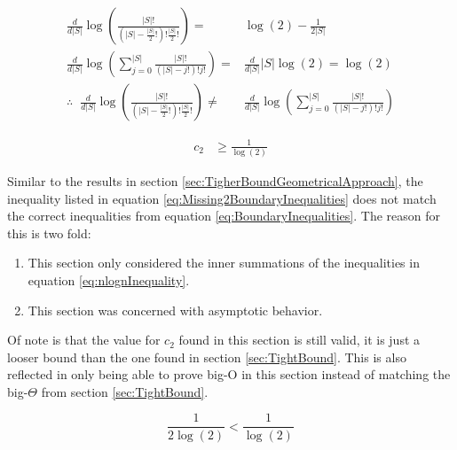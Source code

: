 \documentclass{article}
\begin{document}
\begin{equation*}
	\begin{split}
		\frac{d}{d|S|}				
		\log \left( \frac{
			|S|!
		}{
			\left(|S|-\frac{|S|}{2}!\right)!\frac{|S|}{2}!
		} \right)
		= &
		\log(2)-\frac{1}{2|S|}
		\\
		\frac{d}{d|S|}				
		\log \left( \sum_{j=0}^{|S|} \frac{
			|S|!
		}{
			\left(|S|-j!\right)!j!
		} \right)
		= &
		\frac{d}{d|S|} |S|\log(2)=\log(2)
		\\
		\therefore  \;\;
		\frac{d}{d|S|}				
		\log \left( \frac{
			|S|!
		}{
			\left(|S|-\frac{|S|}{2}!\right)!\frac{|S|}{2}!
		} \right)
		\ne &
		\frac{d}{d|S|}				
		\log \left( \sum_{j=0}^{|S|} \frac{
			|S|!
		}{
			\left(|S|-j!\right)!j!
		} \right)
	\end{split}	
\end{equation*}

\begin{equation}
	\begin{split}
        c_2 &\ge \frac{1}{\log(2)}
	\end{split}
	\label{eq:Missing2BoundaryInequalities}
\end{equation}

Similar to the results in section \ref{sec:TigherBoundGeometricalApproach}, the inequality listed in equation \ref{eq:Missing2BoundaryInequalities} does not match the correct inequalities from equation \ref{eq:BoundaryInequalities}. The reason for this is two fold:

\begin{enumerate}
	\item This section only considered the inner summations of the inequalities in equation \ref{eq:nlognInequality}.
	\item This section was concerned with asymptotic behavior.
\end{enumerate}

Of note is that the value for $c_2$ found in this section is still valid, it is just a looser bound than the one found in section \ref{sec:TightBound}. This is also reflected in only being able to prove big-O in this section instead of matching the big-$\Theta$ from section \ref{sec:TightBound}.

\begin{equation*}
	\frac{1}{2\log(2)}<\frac{1}{\log(2)}
\end{equation*}
\end{document}
